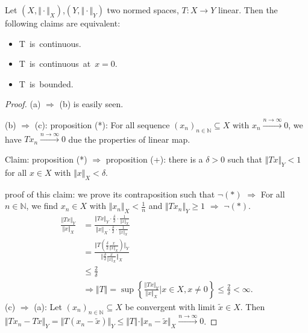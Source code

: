 \documentclass[../../note.tex]{subfiles}
\begin{document}
\begin{proposition}
    Let $(X, \Vert \cdot \Vert_X)$,$(Y, \Vert \cdot \Vert_Y)$ two normed spaces, $T: X \rightarrow Y$ linear. Then the following claims are equivalent:
    \begin{itemize}
        \item T~is~continuous.
        \item T~is~continuous~at~$x = 0$.
        \item T~is~bounded.
    \end{itemize}
\end{proposition}
\begin{proof}
    (a) $\Longrightarrow$ (b) is easily seen.

    (b) $\Longrightarrow$ (c): proposition (*): For all sequence $(x_n)_{n \in \mathbb{N}} \subseteq X$ with $x_n \stackrel{n \rightarrow \infty}{\longrightarrow} 0$, we have $T x_n \stackrel{n \rightarrow \infty}{\longrightarrow} 0$ due the properties of linear map.
    
    Claim: proposition (*) $\Longrightarrow$ proposition (+): there is a $\delta >0$ such that $\Vert Tx \Vert_Y <1$ for all $x \in X$ with $\Vert x \Vert_X < \delta$.

    proof of this claim: we prove its contraposition such that $\neg (*)$ $\Longrightarrow$ For all $n \in \mathbb{N}$, we find $x_n \in X$ with $\Vert x_n \Vert_X < \frac{1}{n}$ and $\Vert T x_n \Vert_Y \geq 1$ $\Longrightarrow$ $\neg (*)$.
    \begin{align}
        \frac{\Vert Tx \Vert_Y}{\Vert x \Vert_X}
        &= \frac{\Vert T x \Vert_Y \cdot \frac{\delta}{2}\cdot \frac{1}{\Vert x \Vert_X}}{\Vert x \Vert_X \cdot \frac{\delta}{2}\cdot \frac{1}{\Vert x \Vert_X}} \\
        &= \frac{\Vert T(\frac{\delta}{2}\frac{x}{\Vert x \Vert_X}) \Vert_Y}{\Vert \frac{\delta}{2} \frac{x}{\Vert x \Vert_X} \Vert_X} \\
        &\leq \frac{2}{\delta} \\
        &\Longrightarrow \Vert T \Vert = \sup\left\{\frac{\Vert Tx \Vert_Y}{\Vert x \Vert_X} \vert x \in X, x \neq 0 \right\} \leq \frac{2}{\delta}<\infty.
    \end{align}
    (c) $\Longrightarrow$ (a): Let $(x_n)_{n \in \mathbb{N}} \subseteq X$ be convergent with limit $\tilde{x} \in X$. Then $\Vert T x_n - T \tilde{x} \Vert_Y = \Vert T(x_n - \tilde{x}) \Vert_Y \leq \Vert T \Vert \cdot \Vert x_n - \tilde{x} \Vert_X \stackrel{n \rightarrow \infty}{\longrightarrow} 0$. 
\end{proof}
\end{document}

